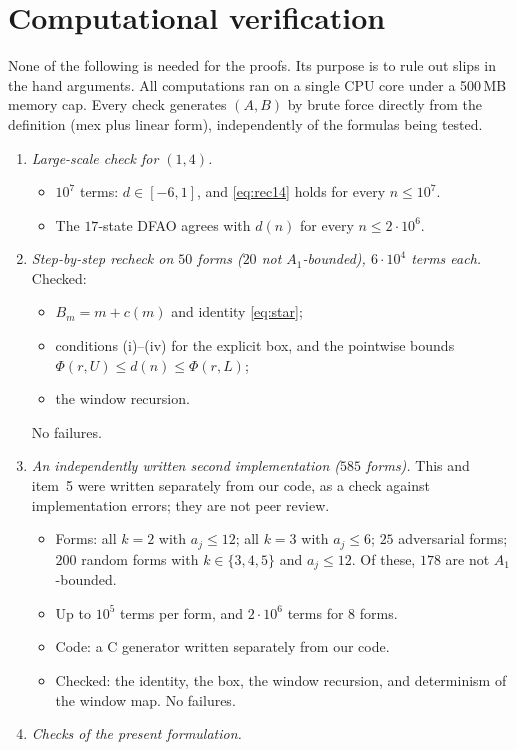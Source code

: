 \documentclass[11pt]{amsart}
\theoremstyle{definition}
\theoremstyle{remark}
\begin{document}
\section{Computational verification}\label{sec:comp}
None of the following is needed for the proofs. Its purpose is to rule out slips in the hand arguments. All computations ran on a single CPU core under a 500\,MB memory cap. Every check generates $(A,B)$ by brute force directly from the definition (mex plus linear form), independently of the formulas being tested.

\begin{enumerate}
\item \emph{Large-scale check for $(1,4)$.}
  \begin{itemize}
  \item $10^7$ terms: $d\in[-6,1]$, and \eqref{eq:rec14} holds for every $n\le10^7$.
  \item The $17$-state DFAO agrees with $d(n)$ for every $n\le2\cdot10^6$.
  \end{itemize}
\item \emph{Step-by-step recheck on $50$ forms ($20$ not $A_1$-bounded), $6\cdot10^4$ terms each.} Checked:
  \begin{itemize}
  \item $B_m=m+c(m)$ and identity \eqref{eq:star};
  \item conditions (i)--(iv) for the explicit box, and the pointwise bounds $\Phi(r,U)\le d(n)\le\Phi(r,L)$;
  \item the window recursion.
  \end{itemize}
  No failures.
\item \emph{An independently written second implementation ($585$ forms).} This and item~5 were written separately from our code, as a check against implementation errors; they are not peer review.
  \begin{itemize}
  \item Forms: all $k=2$ with $a_j\le12$; all $k=3$ with $a_j\le6$; $25$ adversarial forms; $200$ random forms with $k\in\{3,4,5\}$ and $a_j\le12$. Of these, $178$ are not $A_1$-bounded.
  \item Up to $10^5$ terms per form, and $2\cdot10^6$ terms for $8$ forms.
  \item Code: a C generator written separately from our code.
  \item Checked: the identity, the box, the window recursion, and determinism of the window map. No failures.
  \end{itemize}
\item \emph{Checks of the present formulation.}

\end{enumerate}
\end{document}
